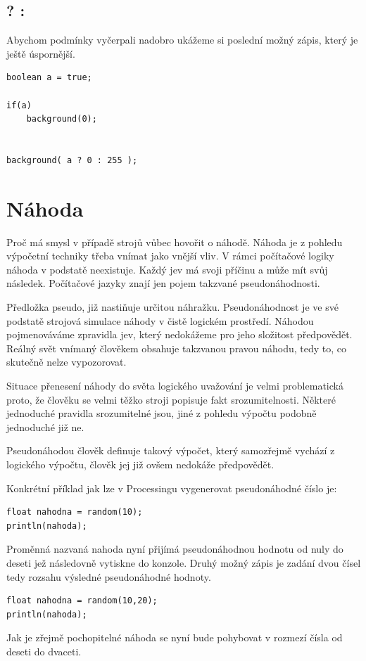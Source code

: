 \documentclass[11pt]{book}
\newcommand{\oddil}[1]{\section{#1}\label{sec:#1}}
\newcommand{\pododdil}[1]{\subsection{#1}\label{subsec:#1}}
\begin{document}
\pododdil{ ? : }

Abychom podmínky vyčerpali nadobro ukážeme si poslední možný zápis, který je ještě úspornější.
  
  
\begin{lstlisting}
boolean a = true;

if(a)
	background(0);
	
	
background( a ? 0 : 255 );

\end{lstlisting}
      


\oddil{Náhoda}

Proč má smysl v případě strojů vůbec hovořit o náhodě. Náhoda je z pohledu výpočetní techniky třeba vnímat jako vnější vliv. V rámci počítačové logiky náhoda v podstatě neexistuje. Každý jev má svoji příčinu a může mít svůj následek. Počítačové jazyky znají jen pojem takzvané pseudonáhodnosti.

Předložka pseudo, již nastiňuje určitou náhražku. Pseudonáhodnost je ve své podstatě strojová simulace náhody v čistě logickém prostředí. Náhodou pojmenováváme zpravidla jev, který nedokážeme pro jeho složitost předpovědět. Reálný svět vnímaný člověkem obsahuje takzvanou pravou náhodu, tedy to, co skutečně nelze vypozorovat.

Situace přenesení náhody do světa logického uvažování je velmi problematická proto, že člověku se velmi těžko stroji popisuje fakt srozumitelnosti. Některé jednoduché pravidla srozumitelné jsou, jiné z pohledu výpočtu podobně jednoduché již ne.

Pseudonáhodou člověk definuje takový výpočet, který samozřejmě vychází z logického výpočtu, člověk jej již ovšem nedokáže předpovědět.

Konkrétní příklad jak lze v Processingu vygenerovat pseudonáhodné číslo je:

\begin{lstlisting}
float nahodna = random(10);
println(nahoda);
\end{lstlisting}

Proměnná nazvaná nahoda nyní přijímá pseudonáhodnou hodnotu od nuly do deseti jež následovně vytiskne do konzole. Druhý možný zápis je zadání dvou čísel tedy rozsahu výsledné pseudonáhodné hodnoty.


\begin{lstlisting}
float nahodna = random(10,20);
println(nahoda);
\end{lstlisting}

Jak je zřejmě pochopitelné náhoda se nyní bude pohybovat v rozmezí čísla od deseti do dvaceti.
\end{document}
